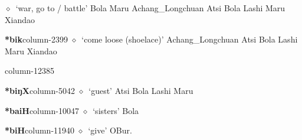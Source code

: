 \hspace{1ex}
         $\diamond$~`war, go to / battle'
         Bola 
\hspace{1ex}
         Maru 
\hspace{1ex}
         Achang\_Longchuan 
\hspace{1ex}
         Atsi 
\hspace{1ex}
         Bola 
\hspace{1ex}
         Lashi 
\hspace{1ex}
         Maru 
\hspace{1ex}
         Xiandao 
  \item {\footnotesize \textbf{*bik}}{\tiny column-2399}
         $\diamond$~`come loose (shoelace)'
         Achang\_Longchuan 
\hspace{1ex}
         Atsi 
\hspace{1ex}
         Bola 
\hspace{1ex}
         Lashi 
\hspace{1ex}
         Maru 
\hspace{1ex}
         Xiandao 
  \item {\footnotesize \textbf{}}{\tiny column-12385}
  \item {\footnotesize \textbf{*biŋX}}{\tiny column-5042}
         $\diamond$~`guest'
         Atsi 
\hspace{1ex}
         Bola 
\hspace{1ex}
         Lashi 
\hspace{1ex}
         Maru 
  \item {\footnotesize \textbf{*baiH}}{\tiny column-10047}
         $\diamond$~`sisters'
         Bola 
  \item {\footnotesize \textbf{*biH}}{\tiny column-11940}
         $\diamond$~`give'
         OBur. 
